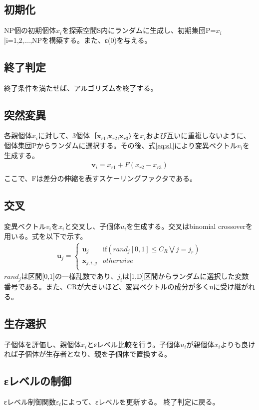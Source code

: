 \documentclass[twocolumn,10pt]{jarticle}
\begin{document}
\subsection{初期化}
NP個の初期個体${x}_i$を探索空間S内にランダムに生成し、初期集団P={${x}_i$|i=1,2,...,NP}を構築する。また、ε(0)を与える。
\subsection{終了判定}
終了条件を満たせば、アルゴリズムを終了する。
\subsection{突然変異}
各親個体${x}_i$に対して、3個体｛$\bm{x}_{r1}$,$\bm{x}_{r2}$,$\bm{x}_{r3}$｝を${x}_i$および互いに重複しないように、個体集団Pからランダムに選択する。その後、式\ref{eq:s1}により変異ベクトル${v}_i$を生成する。
\begin{eqnarray}
\bm{v}_i={x}_{r1}+F({x}_{r2}-{x}_{r3})\\
\label{eq:s1}
\end{eqnarray}
ここで、Fは差分の伸縮を表すスケーリングファクタである。
\subsection{交叉}
変異ベクトル${v}_i$を${x}_i$と交叉し、子個体${u}_i$を生成する。交叉はbinomial crossoverを用いる。式を以下で示す。
\begin{eqnarray}
\bm{u}_j=
\left\{
\begin{array}{cc}
    \bm{u}_j & \mbox{if$({rand}_j[0,1]\leq{C}_R \bigvee j={j}_r)$}\\
    \bm{x}_{j,i,g} & \mbox{$otherwise$}\\
\end{array}
\right.
\end{eqnarray}
${rand}_j$は区間[0,1]の一様乱数であり、${j}_i$は[1,D]区間からランダムに選択した変数番号である。また、CRが大きいほど、変異ベクトルの成分が多くuに受け継がれる。

\subsection{生存選択}
子個体を評価し、親個体${x}_i$とεレベル比較を行う。子個体${u}_i$が親個体${x}_i$よりも良ければ子個体が生存者となり、親を子個体で置換する。
\subsection{εレベルの制御}
εレベル制御関数${ε}_t$によって、εレベルを更新する。
終了判定に戻る。
\end{document}

